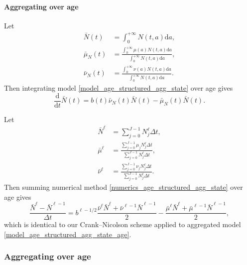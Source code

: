 \documentclass[USenglish]{article}
\newcommand{\md}{\mathrm{d}}
\begin{document}
\paragraph{Aggregating over age}

Let
\begin{subequations}
  \begin{align}
    \bar{N}(t)
    &= \int_0^{+\infty} N(t, a) \md a,
    \\
    \bar{\mu}_N(t)
    &= \frac{\int_0^{+\infty} \mu(a) N(t, a) \md a}
    {\int_0^{+\infty} N(t, a) \md a},
    \\
    \bar{\nu}_N(t)
    &= \frac{\int_0^{+\infty} \nu(a) N(t, a) \md a}
    {\int_0^{+\infty} N(t, a) \md a}.
  \end{align}
\end{subequations}
Then integrating model \eqref{model_age_structured_agg_state} over age
gives
\begin{equation}
  \label{model_age_structured_agg_state_age}
  \frac{\md}{\md t} \bar{N}(t)
  = b(t) \bar{\nu}_N(t) \bar{N}(t)
  - \bar{\mu}_N(t) \bar{N}(t).
\end{equation}

Let
\begin{subequations}
  \begin{align}
    \bar{N}^{\ell}
    &= \sum_{j = 0}^{J - 1} N_j^{\ell} \Delta t,
    \\
    \bar{\mu}^{\ell}
    &= \frac{\sum_{j = 0}^{J - 1} \mu_j N_j^{\ell} \Delta t}
    {\sum_{j = 0}^{J - 1} N_j^{\ell} \Delta t},
    \\
    \bar{\nu}^{\ell}
    &= \frac{\sum_{j = 0}^{J - 1} \nu_j N_j^{\ell} \Delta t}
    {\sum_{j = 0}^{J - 1} N_j^{\ell} \Delta t}.
  \end{align}
\end{subequations}
Then summing numerical method
\eqref{numerics_age_structured_agg_state} over age gives
\begin{equation}
  \label{numerics_age_structured_agg_state_age}
  \frac{\bar{N}^{\ell} - \bar{N}^{\ell - 1}}{\Delta t}
  = b^{\ell - 1 / 2}
  \frac{\bar{\nu}^{\ell} \bar{N}^{\ell}
    + \bar{\nu}^{\ell - 1} \bar{N}^{\ell - 1}}{2}
  - \frac{\bar{\mu}^{\ell} \bar{N}^{\ell}
    + \bar{\mu}^{\ell - 1} \bar{N}^{\ell - 1}}{2},
\end{equation}
which is identical to our Crank--Nicolson scheme applied to aggregated
model \eqref{model_age_structured_agg_state_age}.


\subsubsection{Aggregating over age}
\end{document}
